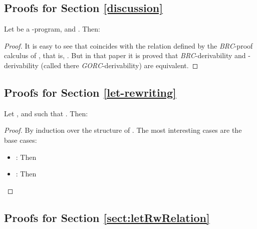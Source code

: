 \subsection{Proofs for Section \ref{discussion}}

Let  be a \crwl-program,  and . Then:

\begin{proof}
It is easy to see that  coincides with the  relation  defined by the   {\it BRC}-proof calculus of \cite{GHLR99}, that is,
.
But in that paper it is proved that {\it BRC}-derivability
and \crwl-derivability (called there {\it GORC}-derivability) are equivalent.
\end{proof}

\subsection{Proofs for Section \ref{let-rewriting}}

Let ,  and  such that .
Then:


\begin{proof}\label{DEMO_auxBind}
By induction over the structure of . The most interesting cases are the base cases:\begin{itemize}
\item : Then

\item : Then

\end{itemize}
\end{proof}

\subsection{Proofs for Section \ref{sect:letRwRelation}}

